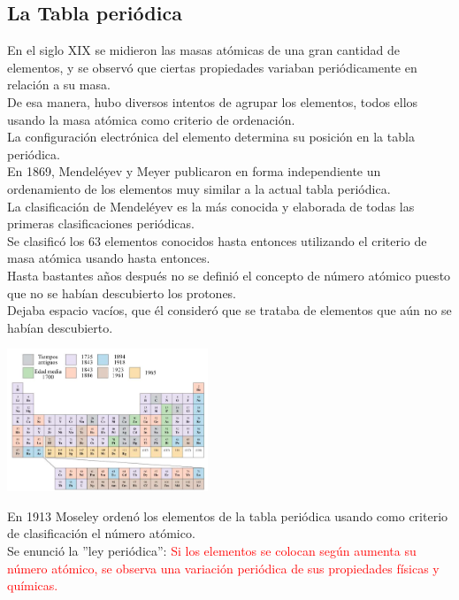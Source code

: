    \subsection{La Tabla periódica}
        \indent En el siglo XIX se midieron las masas atómicas de una gran cantidad de elementos, y se observó que ciertas propiedades variaban periódicamente en relación a su masa. \\
        \indent De esa manera, hubo diversos intentos de agrupar los elementos, todos ellos usando la masa atómica como criterio de ordenación. \\
        \indent La configuración electrónica del elemento determina su posición en la tabla periódica. \\
        \indent En 1869, Mendeléyev y Meyer publicaron en forma independiente un ordenamiento de los elementos muy similar a la actual tabla periódica. \\
        \indent La clasificación de Mendeléyev es la más conocida y elaborada de todas las primeras clasificaciones periódicas. \\
        \indent Se clasificó los 63 elementos conocidos hasta entonces utilizando el criterio de masa atómica usando hasta entonces. \\
        \indent Hasta bastantes años después no se definió el concepto de número atómico puesto que no se habían descubierto los protones. \\
        \indent Dejaba espacio vacíos, que él consideró que se trataba de elementos que aún no se habían descubierto.
        \begin{center} \includegraphics[width=6cm]{./imagenes/tablaPeriodicaMendeleyec.png} \end{center}
        \sangria En 1913 Moseley  ordenó los elementos de la tabla periódica usando como criterio de clasificación el número atómico. \\ 
        \indent Se enunció la ''ley periódica'': \textcolor{red}{Si los elementos se colocan según aumenta su número atómico, se observa una variación periódica de sus propiedades físicas y químicas.} 
